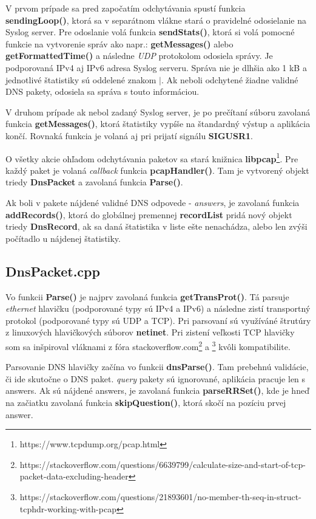 \documentclass{article}
\begin{document}
        V prvom prípade sa pred započatím odchytávania spustí funkcia \textbf{sendingLoop()},
        ktorá sa v separátnom vlákne stará o pravidelné odosielanie na Syslog server. Pre odoslanie volá funkcia \textbf{sendStats()}, ktorá si volá
        pomocné funkcie na vytvorenie správ ako napr.: \textbf{getMessages()} alebo \textbf{getFormattedTime()} a následne \emph{UDP} protokolom 
        odosiela správy. Je podporovaná IPv4 aj IPv6 adresa Syslog serveru. Správa nie je dlhšia ako 1 kB a jednotlivé štatistiky sú oddelené znakom $\vert$. Ak neboli odchytené žiadne validné
        DNS pakety, odosiela sa správa s touto informáciou.

        V druhom prípade ak nebol zadaný Syslog server, je po prečítaní súboru zavolaná funkcia \textbf{getMessages()}, ktorá štatistiky vypíše
        na štandardný výstup a aplikácia končí. Rovnaká funkcia je volaná aj pri prijatí signálu \textbf{SIGUSR1}.

        O všetky akcie ohľadom odchytávania paketov sa stará knižnica \textbf{libpcap}\footnote{https://www.tcpdump.org/pcap.html}. Pre každý paket
        je volaná \emph{callback} funkcia \textbf{pcapHandler()}. Tam je vytvorený objekt triedy \textbf{DnsPacket} a zavolaná funkcia \textbf{Parse()}.

        Ak boli v pakete nájdené validné DNS odpovede - \emph{answers}, je zavolaná funkcia \textbf{addRecords()}, ktorá do globálnej premennej \textbf{recordList} pridá nový
        objekt triedy \textbf{DnsRecord}, ak sa daná štatistika v liste ešte nenachádza, alebo len zvýši počítadlo u nájdenej štatistiky.

        \subsection{DnsPacket.cpp}
        Vo funkcii \textbf{Parse()} je najprv zavolaná funkcia \textbf{getTransProt()}. Tá parsuje \emph{ethernet} hlavičku (podporované typy sú IPv4 a IPv6)
        a následne zistí transportný protokol (podporované typy sú UDP a TCP). Pri parsovaní sú využíváné štrutúry z linuxových hlavičkových súborov \textbf{netinet}.
        Pri zistení veľkosti TCP hlavičky som sa inšpiroval vláknami z fóra stackoverflow.com\footnote{https://stackoverflow.com/questions/6639799/calculate-size-and-start-of-tcp-packet-data-excluding-header}
        a \footnote{https://stackoverflow.com/questions/21893601/no-member-th-seq-in-struct-tcphdr-working-with-pcap} kvôli kompatibilite.

        Parsovanie DNS hlavičky začína vo funkcii \textbf{dnsParse()}. Tam prebehnú validácie, či ide skutočne o DNS paket. \emph{query} pakety sú
        ignorované, aplikácia pracuje len s answers. Ak sú nájdené answers, je zavolaná funkcia \textbf{parseRRSet()}, kde je hneď na začiatku zavolaná funkcia \textbf{skipQuestion()}, ktorá
        skočí na pozíciu prvej answer.
\end{document}
